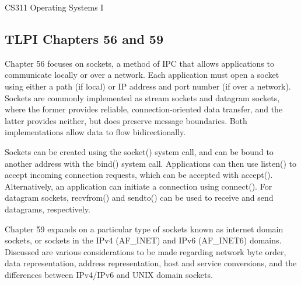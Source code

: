 \documentclass[letterpaper,10pt,fleqn]{article}
\numberwithin{equation}{section}
\begin{document}



{\Large CS311 Operating Systems I}

\subsection*{TLPI Chapters 56 and 59}

Chapter 56 focuses on sockets, a method of IPC that allows applications to communicate locally or over a network.  Each application must open a socket using either a path (if local) or IP address and port number (if over a network).  Sockets are commonly implemented as stream sockets and datagram sockets, where the former provides reliable, connection-oriented data transfer, and the latter provides neither, but does preserve message boundaries.  Both implementations allow data to flow bidirectionally.

Sockets can be created using the socket() system call, and can be bound to another address with the bind() system call.  Applications can then use listen() to accept incoming connection requests, which can be accepted with accept().  Alternatively, an application can initiate a connection using connect().  For datagram sockets, recvfrom() and sendto() can be used to receive and send datagrams, respectively.

Chapter 59 expands on a particular type of sockets known as internet domain sockets, or sockets in the IPv4 (AF\_INET) and IPv6 (AF\_INET6) domains.  Discussed are various considerations to be made regarding network byte order, data representation, address representation, host and service conversions, and the differences between IPv4/IPv6 and UNIX domain sockets.
\end{document}
